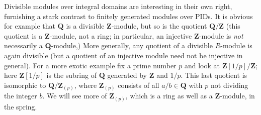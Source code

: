 \documentclass[10pt]{article}
\begin{document}
Divisible modules over integral domains are interesting in their own
right, furnishing a stark contrast to finitely generated modules over
PIDs. It is obvious for example that $\mathbf{Q}$ is a divisible
$\mathbf{Z}$-module, but so is the quotient $\mathbf{Q}/\mathbf{Z}$
(this quotient is a $\mathbf{Z}$-module, not a ring; in particular, an
injective $\mathbf{Z}$-module is {\sl not} necessarily a
$\mathbf{Q}$-module,) More generally, any quotient of a divisible
$R$-module is again divisible (but a quotient of an injective module
need not be injective in general). For a more exotic example fix a prime
number $p$ and look at $\mathbf{Z}[1/p]/\mathbf{Z}$; here
$\mathbf{Z}[1/p]$ is the subring of $\mathbf{Q}$ generated by
$\mathbf{Z}$ and $1/p$. This last quotient is isomorphic to
$\mathbf{Q}/\mathbf{Z}_{(p)}$, where $\mathbf{Z}_{(p)}$ consists of all
$a/b\in\mathbf{Q}$ with $p$ not dividing the integer $b$. We will see
more of $\mathbf{Z}_{(p)}$, which is a ring as well as a
$\mathbf{Z}$-module, in the spring.
\end{document}
